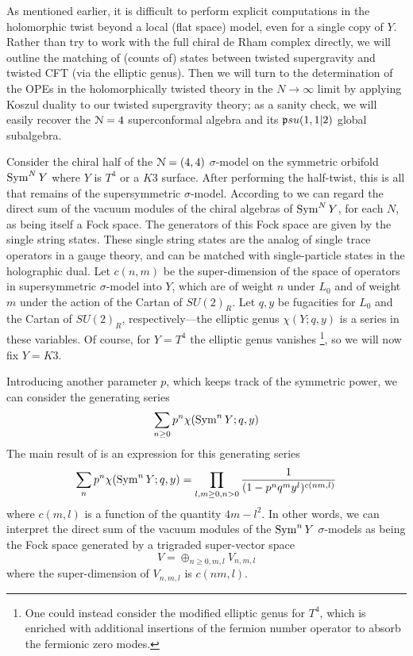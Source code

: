\documentclass[../main.tex]{subfiles}
\begin{document}
As mentioned earlier, it is difficult to perform explicit computations in the holomorphic twist beyond a local (flat space) model, even for a single copy of $Y$. Rather than try to work with the full chiral de Rham complex directly, we will outline the matching of (counts of) states between twisted supergravity and twisted CFT (via the elliptic genus). Then we will turn to the determination of the OPEs in the holomorphically twisted theory in the $N \rightarrow \infty$ limit by applying Koszul duality to our twisted supergravity theory; as a sanity check, we will easily recover the $\mathcal{N}=4$ superconformal algebra and its $\mathfrak psu(1,1|2)$ global subalgebra.


Consider the chiral half of the $\mathcal N= (4,4)$ $\sigma$-model on the symmetric orbifold  $\operatorname{Sym}^N Y$ where $Y$ is $T^4$ or a $K3$ surface. 
After performing the half-twist, this is all that remains of the supersymmetric $\sigma$-model.
 According to \cite{DMVV} we can regard the direct sum of the vacuum modules of the chiral algebras of $\operatorname{Sym}^N Y$, for each $N$, as being itself a Fock space. The generators of this Fock space are given by the single string states. These single string states are the analog of single trace operators in a gauge theory, and can be matched with single-particle states in the holographic dual. Let $c(n,m)$ be the super-dimension of the space of operators in supersymmetric $\sigma$-model into $Y$, which are of weight $n$ under $L_0$ and of weight $m$ under the action of the Cartan of $SU(2)_R$.  
Let $q,y$ be fugacities for $L_0$ and the Cartan of $SU(2)_R$, respectively---the elliptic genus $\chi(Y;q,y)$ is a series in these variables.  
Of course, for $Y = T^4$ the elliptic genus vanishes \footnote{One could instead consider the modified elliptic genus for $T^4$, which is enriched with additional insertions of the fermion number operator to absorb the fermionic zero modes.}, so we will now fix $Y = K3$.

Introducing another parameter $p$, which keeps track of the symmetric power, we can consider the generating series
\begin{equation} 
	\sum_{n \geq 0} p^n \chi(\operatorname{Sym}^n Y; q,y) 
\end{equation}
The main result of \cite{deBoerEG, DMVV} is an expression for this generating series
\begin{equation} 
	\sum_{n} p^n \chi(\operatorname{Sym}^n Y; q,y) = \prod_{l,m \geq 0,n >0 } \frac{1}{(1 - p^n q^m y^l)^{c(nm,l)}}
\end{equation}
where $c(m,l)$ is a function of the quantity $4m-l^2$.
In other words, we can interpret the direct sum of the vacuum modules of the $\operatorname{Sym}^n Y$ $\sigma$-models as being the Fock space generated by a trigraded super-vector space 
\begin{equation} 
	V =\oplus_{n \ge 0,m,l} V_{n,m,l} 
\end{equation}
where the super-dimension of $V_{n,m,l}$ is $c(nm,l)$.
\end{document}
